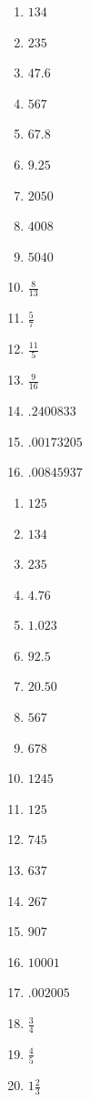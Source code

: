 \newpage
{}

\begin{multicols}{5}
\begin{enumerate}[$(1)$]
\item $134$
\item $235$
\item $47.6$
\item $567$
\item $67.8$
\item $9.25$
\item $2050$
\item $4008$
\item $5040$
\item $\frac{8}{13}$
\item $\frac{5}{7}$
\item $\frac{11}{5}$
\item $\frac{9}{16}$
\item $.2400833$
\item $.00173205$
\item $.00845937$
\end{enumerate}
\end{multicols}


\begin{multicols}{5}
\begin{enumerate}[$(1)$]
\item $125$
\item $134$
\item $235$
\item $4.76$
\item $1.023$
\item $92.5$
\item $20.50$
\item $567$
\item $678$
\item $1245$
\item $125$
\item $745$
\item $637$
\item $267$
\item $907$
\item $10001$
\item $.002005$
\item $\frac{3}{4}$
\item $\frac{4}{5}$
\item $1\frac{2}{3}$
\end{enumerate}
\end{multicols}

